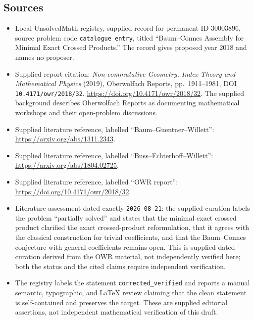 \documentclass[11pt]{article}
\begin{document}
\subsection{Sources}
\begin{itemize}
\item Local UnsolvedMath registry, supplied record for permanent ID \(30003896\), source problem code \texttt{catalogue entry}, titled ``Baum--Connes Assembly for Minimal Exact Crossed Products.'' The record gives proposed year 2018 and names no proposer.
\item Supplied report citation: \emph{Non-commutative Geometry, Index Theory and Mathematical Physics} (2019), Oberwolfach Reports, pp.~1911--1981, DOI \texttt{10.4171/owr/2018/32}. \url{https://doi.org/10.4171/owr/2018/32}. The supplied background describes Oberwolfach Reports as documenting mathematical workshops and their open-problem discussions.
\item Supplied literature reference, labelled ``Baum--Guentner--Willett'': \url{https://arxiv.org/abs/1311.2343}.
\item Supplied literature reference, labelled ``Buss--Echterhoff--Willett'': \url{https://arxiv.org/abs/1804.02725}.
\item Supplied literature reference, labelled ``OWR report'': \url{https://doi.org/10.4171/owr/2018/32}.
\item Literature assessment dated exactly \texttt{2026-08-21}: the supplied curation labels the problem ``partially solved'' and states that the minimal exact crossed product clarified the exact crossed-product reformulation, that it agrees with the classical construction for trivial coefficients, and that the Baum--Connes conjecture with general coefficients remains open. This is supplied dated curation derived from the OWR material, not independently verified here; both the status and the cited claims require independent verification.
\item The registry labels the statement \texttt{corrected\_verified} and reports a manual semantic, typographic, and LaTeX review claiming that the clean statement is self-contained and preserves the target. These are supplied editorial assertions, not independent mathematical verification of this draft.
\end{itemize}
\end{document}
